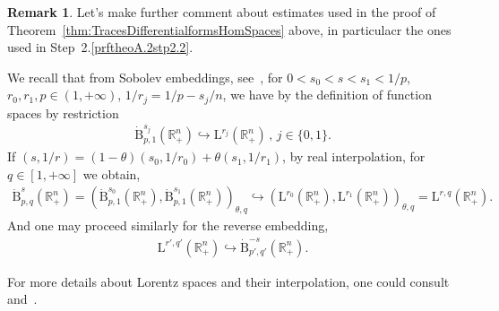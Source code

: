 \documentclass[10pt]{amsart}
\theoremstyle{definition}\newtheorem{defi}[theo]{Definition}\newtheorem{rema}[theo]{Remark}\newtheorem{exam}[theo]{Example}\newtheorem{exem}[theo]{Example}\newtheorem{nota}[theo]{Notation}
\newcommand{\bbR}{\mathbb{R}}
\newcommand{\rmB}{\mathrm{B}}
\newcommand{\rmL}{\mathrm{L}}
\begin{document}
\begin{rema}
Let's make further comment about estimates used in the proof of Theorem~\ref{thm:TracesDifferentialformsHomSpaces} above, in particulacr the ones used in Step~2.\ref{prftheoA.2stp2.2}.

We recall that from Sobolev embeddings, see~\cite[Proposition~2.39]{bookBahouriCheminDanchin}, for $0<s_0<s<s_1<1/p$, $r_0,r_1,p\in(1,+\infty)$, $1/r_j = 1/p-s_j/n$, we have by the definition of function spaces by restriction
\begin{align*}
\dot{\rmB}^{s_j}_{p,1}\left(\bbR^n_+\right) \hookrightarrow \rmL^{r_j}\left(\bbR^n_+\right) \,,\, j\in\{ 0, 1\} .
\end{align*}
If $(s,1/r)=(1-\theta)(s_0,1/r_0)+ \theta (s_1,1/r_1)$, by real interpolation, for $q\in[1,+\infty]$ we obtain,
\begin{align*}
\dot{\rmB}^{s}_{p,q}\left(\bbR^n_+\right) = \left(\dot{\rmB}^{s_0}_{p,1}\left(\bbR^n_+\right),\dot{\rmB}^{s_1}_{p,1}\left(\bbR^n_+\right)\right)_{\theta,q} \hookrightarrow\left({\rmL}^{r_0}\left(\bbR^n_+\right),{\rmL}^{r_1}\left(\bbR^n_+\right)\right)_{\theta,q} = {\rmL}^{r,q}\left(\bbR^n_+\right) .
\end{align*}
And one may proceed similarly for the reverse embedding,
\begin{align*}
{\rmL}^{r',q'}(\bbR^n_+) \hookrightarrow\dot{\rmB}^{-s}_{p',q'}\left(\bbR^n_+\right).
\end{align*}

For more details about Lorentz spaces and their interpolation, one could consult~\cite[Section~1,~Examples~1.10,~1.11~\&~1.27]{bookLunardiInterpTheory} and~\cite[Chapter~5,~Section~5.3]{BerghLofstrom1976}.
\end{rema}
\end{document}
